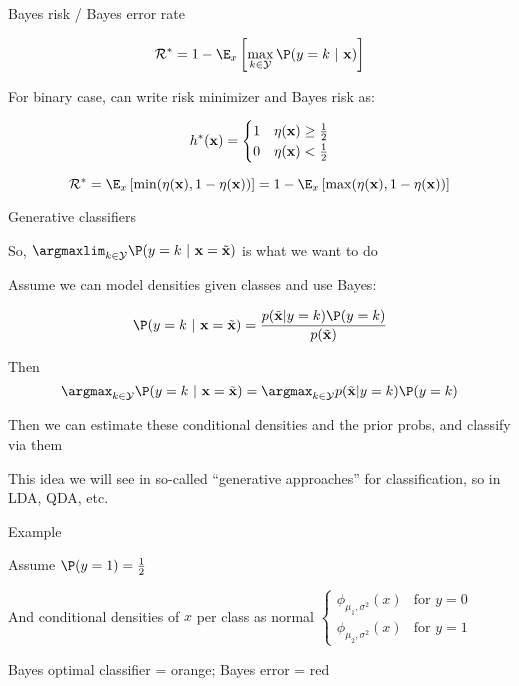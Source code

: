 \documentclass[11pt,compress,t,notes=noshow, xcolor=table]{beamer}
\begin{document}
\begin{frame}{Bayes risk  / Bayes error rate}

$$
\riskbayes = 1 - \E_{x} \left[\max_{k \in \Yspace} \P(y = k~|~ \xv)\right]
$$

\vfill

For binary case, can write risk minimizer and Bayes risk as:  

$$
h^{\ast}(\mathbf{x}) = \begin{cases} 1 & \eta(\mathbf{x}) \ge \frac{1}{2} \\ 0 & \eta(\mathbf{x}) < \frac{1}{2}\end{cases} 
$$

$$
\riskbayes = \E_x\left[\min(\eta(\xv), 1 - \eta(\xv))\right] = 1 - \E_x\left[\max(\eta(\xv), 1 - \eta(\xv))\right] 
$$


\end{frame}


\begin{framei}[sep=M]{Generative classifiers}


\item So, $\argmaxlim_{k \in \Yspace} \P(y = k~|~ \xv = \xtil)$ is what we want to do

\item Assume we can model densities given classes and use Bayes:

$$
\P(y = k~|~ \xv = \xtil)  = \frac{p(\xtil | y = k) \P(y = k)} {p(\xtil)} 
$$

\item Then
$$
\argmax_{k \in \Yspace} \P(y = k~|~ \xv = \xtil) = \argmax_{k \in \Yspace}  p(\xtil | y = k) \P(y = k)
$$
\item Then we can estimate these conditional densities and the prior probs, and classify via them

\item This idea we will see in so-called ``generative approaches'' for classification, so in LDA, QDA, etc.

\end{framei}


\begin{framei}[sep=M]{Example}

\item  Assume $\P(y = 1) = \frac{1}{2}$ 
\item And conditional densities of $x$ per class as normal $
\begin{cases}
\phi_{\mu_1, \sigma^2}(x) & \text{for } y = 0\\ 
\phi_{\mu_2, \sigma^2}(x) & \text{for } y = 1
\end{cases}$

\item Bayes optimal classifier = orange; Bayes error = red 


\end{framei}

\endlecture
\end{document}
